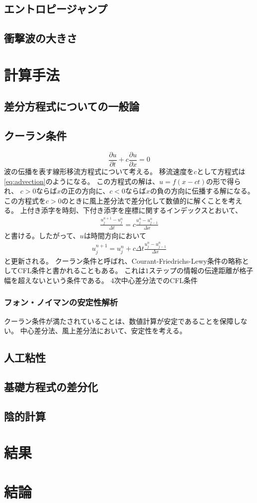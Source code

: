\documentclass{jsarticle}
\newcommand{\pder}[2][]{\frac{\partial#1}{\partial#2}}
\begin{document}
\subsection{エントロピージャンプ}
\subsection{衝撃波の大きさ}
\section{計算手法}
\subsection{差分方程式についての一般論}
\subsection{クーラン条件}
\begin{equation}
    \pder[u]{t} + c\pder[u]{x} = 0\label{eq:advection}
\end{equation}
波の伝播を表す線形移流方程式について考える。
移流速度を$c$として方程式は\eqref{eq:advection}のようになる。
この方程式の解は、$u = f(x -ct)$の形で得られ、
$c>0$ならば$x$の正の方向に、$c<0$ならば$x$の負の方向に伝播する解になる。
この方程式を$c>0$のときに風上差分法で差分化して数値的に解くことを考える。
上付き添字を時刻、下付き添字を座標に関するインデックスとおいて、
\begin{align}
    \frac{u^{n+1}_j - u^{n}_j}{\Delta t} = c \frac{u^n_{j} - u^n_{j-1}}{\Delta x}
\end{align}
と書ける。したがって、$u$は時間方向において
\begin{align}
    u^{n+1}_j  =  u^{n}_j+ c \Delta t\frac{u^n_{j} - u^n_{j-1}}{\Delta x}
\end{align}
と更新される。
クーラン条件と呼ばれ、Courant-Friedrichs-Lewy条件の略称としてCFL条件と書かれることもある。
これは$1$ステップの情報の伝達距離が格子幅を超えないという条件である。%
4次中心差分法でのCFL条件
\subsubsection{フォン・ノイマンの安定性解析}
クーラン条件が満たされていることは、数値計算が安定であることを保障しない。
中心差分法、風上差分法において、安定性を考える。
\subsection{人工粘性}
\subsection{基礎方程式の差分化}
\subsection{陰的計算}
\section{結果}
\section{結論}
\end{document}
